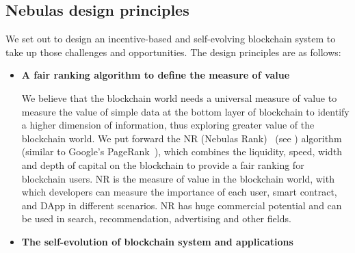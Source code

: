 \subsection{Nebulas design principles}
We set out to design an incentive-based and self-evolving blockchain system to take up those challenges and opportunities. The design principles are as follows:
\begin{itemize}
	\item \textbf{A fair ranking algorithm to define the measure of value}
	
We believe that the blockchain world needs a universal measure of value to measure the value of simple data at the bottom layer of blockchain to identify a higher dimension of information, thus exploring greater value of the blockchain world. We put forward the NR (Nebulas Rank) ~(see ) algorithm (similar to Google's PageRank~\cite{Brin2010}\cite{page1999pagerank}), which combines the liquidity, speed, width and depth of capital on the blockchain to provide a fair ranking for blockchain users. NR is the measure of value in the blockchain world, with which developers can measure the importance of each user, smart contract, and DApp in different scenarios. NR has huge commercial potential and can be used in search, recommendation, advertising and other fields.

\item \textbf{The self-evolution of blockchain system and applications}


\end{itemize}
